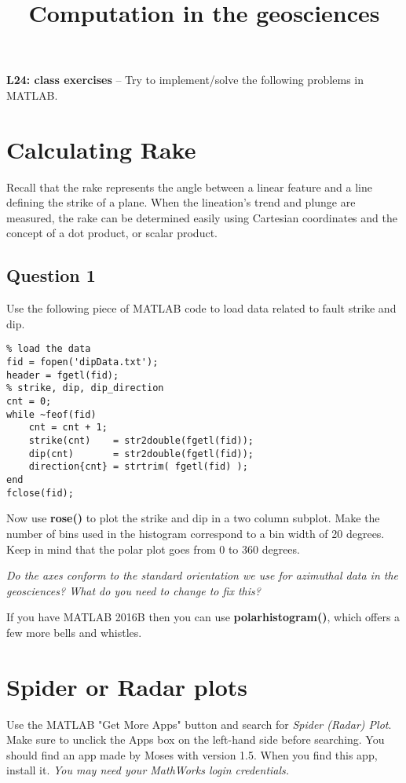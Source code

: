 \documentclass[10pt,fleqn]{article}
\title{Computation in the geosciences}
\date{\empty}
\begin{document}
\textbf{L24: class exercises} -- Try to implement/solve the following problems in MATLAB.

\section*{Calculating Rake}

Recall that the rake represents the angle between a linear feature and a line defining the strike of a plane.  When the lineation’s trend and plunge are measured, the rake can be determined easily using Cartesian coordinates and the concept of a dot product, or scalar product. 

\subsection*{Question 1}



Use the following piece of MATLAB code to load data related to fault strike and dip.

\begin{lstlisting}
% load the data
fid = fopen('dipData.txt');
header = fgetl(fid);
% strike, dip, dip_direction
cnt = 0;
while ~feof(fid)
    cnt = cnt + 1;
    strike(cnt)    = str2double(fgetl(fid));
    dip(cnt)       = str2double(fgetl(fid));
    direction{cnt} = strtrim( fgetl(fid) );
end
fclose(fid);
\end{lstlisting}

Now use \textbf{rose()} to plot the strike and dip in a two column subplot. Make the number of bins used in the histogram correspond to a bin width of 20 degrees. Keep in mind that the polar plot goes from 0 to 360 degrees.

\textit{Do the axes conform to the standard orientation we use for azimuthal data in the geosciences? What do you need to change to fix this?
}

If you have MATLAB 2016B then you can use \textbf{polarhistogram()}, which offers a few more bells and whistles.

\section*{Spider or Radar plots}

Use the MATLAB "Get More Apps" button and search for \textit{Spider (Radar) Plot}. Make sure to unclick the Apps box on the left-hand side before searching. You should find an app made by Moses with version 1.5. When you find this app, install it. \textit{You may need your MathWorks login credentials.}
\end{document}
